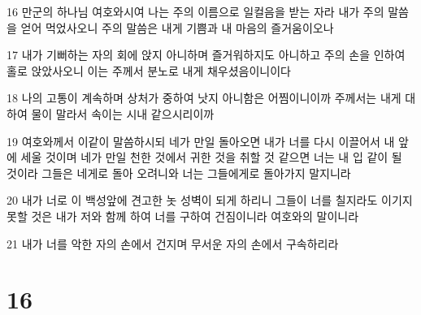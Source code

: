\par 16 만군의 하나님 여호와시여 나는 주의 이름으로 일컬음을 받는 자라 내가 주의 말씀을 얻어 먹었사오니 주의 말씀은 내게 기쁨과 내 마음의 즐거움이오나
\par 17 내가 기뻐하는 자의 회에 앉지 아니하며 즐거워하지도 아니하고 주의 손을 인하여 홀로 앉았사오니 이는 주께서 분노로 내게 채우셨음이니이다
\par 18 나의 고통이 계속하며 상처가 중하여 낫지 아니함은 어찜이니이까 주께서는 내게 대하여 물이 말라서 속이는 시내 같으시리이까
\par 19 여호와께서 이같이 말씀하시되 네가 만일 돌아오면 내가 너를 다시 이끌어서 내 앞에 세울 것이며 네가 만일 천한 것에서 귀한 것을 취할 것 같으면 너는 내 입 같이 될 것이라 그들은 네게로 돌아 오려니와 너는 그들에게로 돌아가지 말지니라
\par 20 내가 너로 이 백성앞에 견고한 놋 성벽이 되게 하리니 그들이 너를 칠지라도 이기지 못할 것은 내가 저와 함께 하여 너를 구하여 건짐이니라 여호와의 말이니라
\par 21 내가 너를 악한 자의 손에서 건지며 무서운 자의 손에서 구속하리라

\chapter{16}

